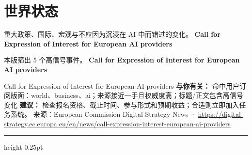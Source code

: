\documentclass[10.5pt]{ctexart}
\begin{document}
\section*{世界状态}
{\color{ormuted} 重大政策、国际、宏观与不应因为沉浸在 AI 中而错过的变化。}
\vspace{2mm}
{\LARGE\bfseries Call for Expression of Interest for European AI providers}\par
\vspace{1mm}
{\color{ormuted} 本版筛出 5 个高信号事件。}
\vspace{3mm}
{\Large\bfseries Call for Expression of Interest for European AI providers}\par
Call for Expression of Interest for European AI providers
\textbf{与你有关：} 命中用户订阅版面：world、business、ai；来源接近一手且权威度高；标题/正文包含高信号变化
\textbf{建议：} 检查报名资格、截止时间、参与形式和预期收益；合适则立即加入任务系统。
{\footnotesize\color{ormuted} 来源：European Commission Digital Strategy News · \url{https://digital-strategy.ec.europa.eu/en/news/call-expression-interest-european-ai-providers}}
\vspace{4mm}
\hrule height 0.25pt
\vspace{3mm}
\end{document}
